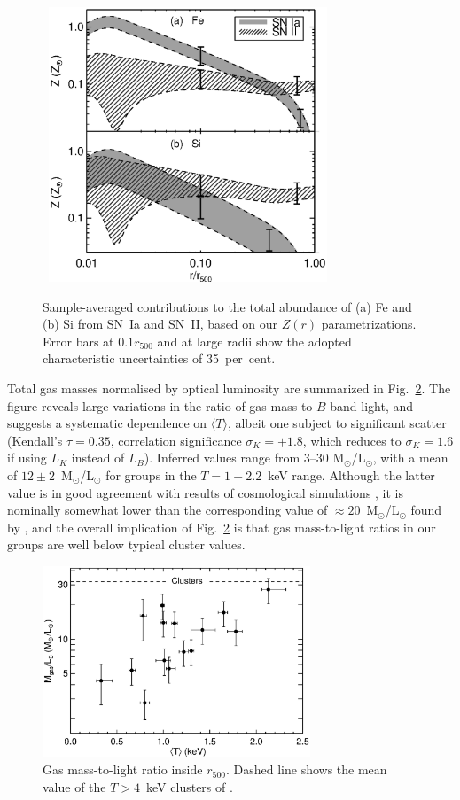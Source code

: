 \documentclass[useAMS,usenatbib]{mn2e}
\begin{document}
\begin{figure} 
\mbox{\hspace{-1mm} 
\includegraphics[width=83mm]{fig6.eps}}
\caption{Sample-averaged contributions to the total abundance of (a)
   Fe and (b) Si from SN~Ia and SN~II, based on our $Z(r)$
   parametrizations. Error bars at $0.1r_{500}$ and at large radii
   show the adopted characteristic uncertainties of 35~per~cent.}
\label{fig,SN} 
\end{figure} 
 

Total gas masses normalised by optical luminosity are summarized in
Fig.~\ref{fig,gas}. The figure reveals large variations in the ratio
of gas mass to $B$-band light, and suggests a systematic dependence on
$\langle T\rangle$, albeit one subject to significant scatter
(Kendall's $\tau=0.35$, correlation significance $\sigma_K = +1.8$,
which reduces to $\sigma_K = 1.6$ if using $L_K$ instead of
$L_B$). Inferred values range from 3--30 M$_\odot$/L$_\odot$, with a
mean of $12\pm 2$~M$_\odot$/L$_\odot$ for groups in the $T=1-2.2$~keV
range. Although the latter value is in good agreement with results of
cosmological simulations \citep{rome06}, it is nominally somewhat
lower than the corresponding value of $\approx 20$~M$_\odot$/L$_\odot$
found by \citet*{fino03}, and the overall implication of
Fig.~\ref{fig,gas} is that gas mass-to-light ratios in our groups are
well below typical cluster values.

\begin{figure} 
 \includegraphics[width=80mm]{fig7.eps}
 \caption{Gas mass-to-light ratio inside $r_{500}$. Dashed line shows
    the mean value of the $T>4$~keV clusters of \citet{fino03}.}
\label{fig,gas} 
\end{figure} 
\end{document}
